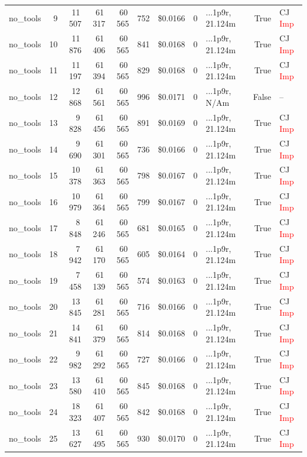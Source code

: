 \documentclass[a4paper,11pt]{article}
\begin{document}
\begin{table}[H]
{\begin{tabular}{l r r r r r r r l r l}
no\_tools & 9 & 11\,507 & 61\,317 & 60\,565 & 752 & \$0.0166 & 0 & ...1p9r, 21.124m & True & CJ \textcolor{red}{Imp} \\
no\_tools & 10 & 11\,876 & 61\,406 & 60\,565 & 841 & \$0.0168 & 0 & ...1p9r, 21.124m & True & CJ \textcolor{red}{Imp} \\
no\_tools & 11 & 11\,197 & 61\,394 & 60\,565 & 829 & \$0.0168 & 0 & ...1p9r, 21.124m & True & CJ \textcolor{red}{Imp} \\
no\_tools & 12 & 12\,868 & 61\,561 & 60\,565 & 996 & \$0.0171 & 0 & ...1p9r, N/Am & False & -- \\
no\_tools & 13 & 9\,828 & 61\,456 & 60\,565 & 891 & \$0.0169 & 0 & ...1p9r, 21.124m & True & CJ \textcolor{red}{Imp} \\
no\_tools & 14 & 9\,690 & 61\,301 & 60\,565 & 736 & \$0.0166 & 0 & ...1p9r, 21.124m & True & CJ \textcolor{red}{Imp} \\
no\_tools & 15 & 10\,378 & 61\,363 & 60\,565 & 798 & \$0.0167 & 0 & ...1p9r, 21.124m & True & CJ \textcolor{red}{Imp} \\
no\_tools & 16 & 10\,979 & 61\,364 & 60\,565 & 799 & \$0.0167 & 0 & ...1p9r, 21.124m & True & CJ \textcolor{red}{Imp} \\
no\_tools & 17 & 8\,848 & 61\,246 & 60\,565 & 681 & \$0.0165 & 0 & ...1p9r, 21.124m & True & CJ \textcolor{red}{Imp} \\
no\_tools & 18 & 7\,942 & 61\,170 & 60\,565 & 605 & \$0.0164 & 0 & ...1p9r, 21.124m & True & CJ \textcolor{red}{Imp} \\
no\_tools & 19 & 7\,458 & 61\,139 & 60\,565 & 574 & \$0.0163 & 0 & ...1p9r, 21.124m & True & CJ \textcolor{red}{Imp} \\
no\_tools & 20 & 13\,845 & 61\,281 & 60\,565 & 716 & \$0.0166 & 0 & ...1p9r, 21.124m & True & CJ \textcolor{red}{Imp} \\
no\_tools & 21 & 14\,841 & 61\,379 & 60\,565 & 814 & \$0.0168 & 0 & ...1p9r, 21.124m & True & CJ \textcolor{red}{Imp} \\
no\_tools & 22 & 9\,982 & 61\,292 & 60\,565 & 727 & \$0.0166 & 0 & ...1p9r, 21.124m & True & CJ \textcolor{red}{Imp} \\
no\_tools & 23 & 13\,580 & 61\,410 & 60\,565 & 845 & \$0.0168 & 0 & ...1p9r, 21.124m & True & CJ \textcolor{red}{Imp} \\
no\_tools & 24 & 18\,323 & 61\,407 & 60\,565 & 842 & \$0.0168 & 0 & ...1p9r, 21.124m & True & CJ \textcolor{red}{Imp} \\
no\_tools & 25 & 13\,627 & 61\,495 & 60\,565 & 930 & \$0.0170 & 0 & ...1p9r, 21.124m & True & CJ \textcolor{red}{Imp} \\

\end{tabular}}
\end{table}
\end{document}
